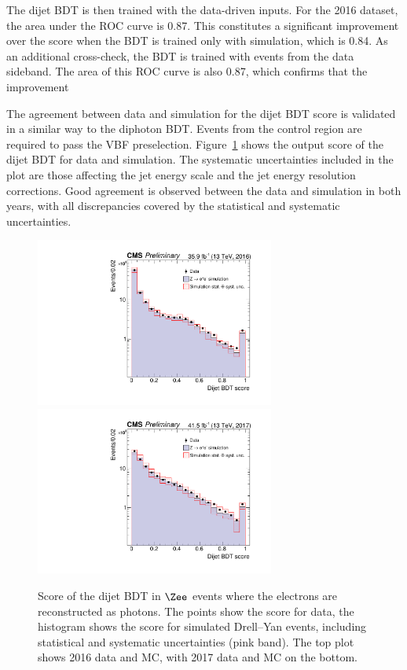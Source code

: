 The dijet BDT is then trained with the data-driven inputs.
For the 2016 dataset, the area under the ROC curve is 0.87.
This constitutes a significant improvement over the score when the BDT is trained only with simulation, 
which is 0.84.
As an additional cross-check, the BDT is trained with events from the data sideband. 
The area of this ROC curve is also 0.87, 
which confirms that the improvement

The agreement between data and simulation for the dijet BDT score is validated 
in a similar way to the diphoton BDT.
Events from the \Zee control region are required to pass the VBF preselection.
Figure~\ref{fig:cat_dijetBDT} shows the output score of the dijet BDT for data and simulation.
The systematic uncertainties included in the plot are those affecting the 
jet energy scale and the jet energy resolution corrections.
Good agreement is observed between the data and simulation in both years, 
with all discrepancies covered by the statistical and systematic uncertainties.

\begin{figure}[hptb]
\centering
\includegraphics[width=0.7\textwidth]{Figures/Categorisation/DijetBDT_2016.pdf}
\includegraphics[width=0.7\textwidth]{Figures/Categorisation/DijetBDT_2017.pdf}
\caption{
  Score of the dijet BDT in $\Zee$
  events where the electrons are reconstructed as photons.
  The points show the score for data, the histogram shows
  the score for simulated Drell--Yan events, including statistical and 
  systematic uncertainties (pink band).
  The top plot shows 2016 data and MC,
  with 2017 data and MC on the bottom.
}
\label{fig:cat_dijetBDT}
\end{figure}

